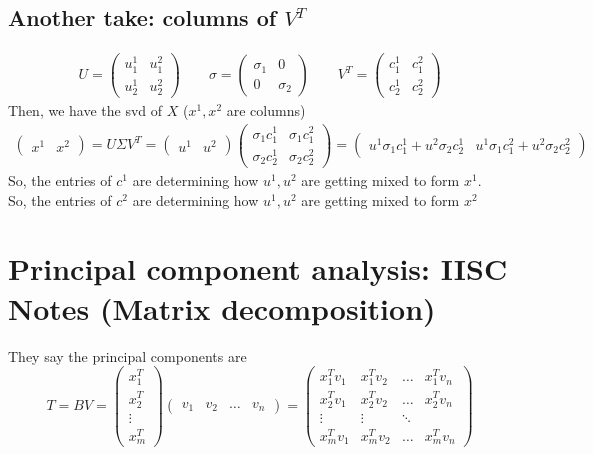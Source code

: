 \documentclass{article}
\newcommand{\beq}{\begin{equation}}
\newcommand{\eeq}{\end{equation}}
\newcommand{\ber}{\begin{eqnarray}}
\newcommand{\eer}{\end{eqnarray}}
\begin{document}
\subsection{Another take: columns of $V^T$}
\ber
U =
\begin{pmatrix}
  u^1_1 & u^2_1\\
  u^1_2 & u^2_2
\end{pmatrix}
\qquad
\sigma=
\begin{pmatrix}
  \sigma_1 & 0 \\
  0   &  \sigma_2 
\end{pmatrix}  
\qquad
V^T =
\begin{pmatrix}
  c^1_1 & c^2_1\\
  c^1_2 & c^2_2
\end{pmatrix} 
\eer
Then, we have the svd of $X$ ($x^1,x^2$ are columns)
\ber
\begin{pmatrix}
  x^1 & x^2
\end{pmatrix}
=
U\Sigma{}V^T =
\begin{pmatrix}
u^1 & u^2   
\end{pmatrix}
\begin{pmatrix}
  \sigma_1 c^1_1 & \sigma_1 c^2_1\\
  \sigma_2 c^1_2 & \sigma_2 c^2_2
\end{pmatrix}
=
\begin{pmatrix}
  u^1\sigma_1c^1_1 + u^2\sigma_2c^1_2  & u^1\sigma_1c^2_1 + u^2\sigma_2c^2_2
\end{pmatrix}  
\eer
So, the entries of $c^1$ are determining how $u^1,u^2$ are getting mixed to form  $x^1$. \\
So, the entries of $c^2$ are determining how $u^1,u^2$ are getting mixed to form  $x^2$
%
%
%
\section{Principal component analysis: IISC Notes (Matrix decomposition)}
They say the principal components are
\beq
T = BV =
\begin{pmatrix}
  x_{1}^T\\
  x_{2}^{T}\\
  \vdots\\
  x_{m}^T
\end{pmatrix}
\begin{pmatrix}
  v_1 & v_2 & \hdots & v_n
\end{pmatrix}
=
\begin{pmatrix}
  x_1^Tv_1 & x_1^Tv_2 & \hdots & x_1^Tv_n\\
  x_2^Tv_1 & x_2^Tv_2 & \hdots & x_2^Tv_n\\
  \vdots & \vdots &  \ddots &  \\
  x_m^Tv_1 & x_m^Tv_2 & \hdots & x_m^Tv_n
\end{pmatrix}  
\eeq
%
%
%
\end{document}
